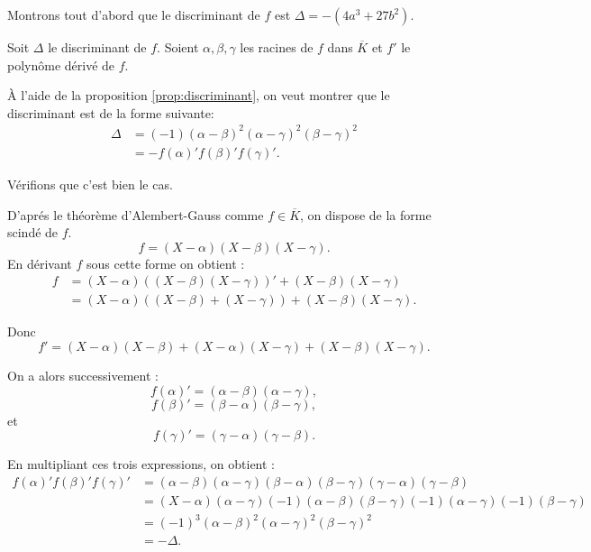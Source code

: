 \begin{demonstration}[Lemme]
    Montrons tout d'abord que le discriminant de $f$ est $\Delta= -(4a^3 + 27b^2)$.

    Soit $\Delta$ le discriminant de $f$. Soient $\alpha, \beta, \gamma $ les racines de $f$ dans $\overline{K}$ et $f'$ le polynôme dérivé de $f$.

    À l'aide de la proposition \ref{prop:discriminant}, on veut montrer que le discriminant est de la forme
    suivante: 
    \begin{align*}
        \Delta &= (-1) ( \alpha - \beta )^2 ( \alpha - \gamma )^2 ( \beta - \gamma )^2 \\
          &= - f(\alpha)'f(\beta )'f(\gamma)'
    .\end{align*}

    Vérifions que c'est bien le cas.

    D'aprés le théorème d'Alembert-Gauss comme $f \in \overline{K}$, on dispose de la
    forme scindé de $f$.
    \[
        f = \left( X - \alpha \right) \left( X - \beta \right) \left( X - \gamma \right) 
    .\] 
    En dérivant $f$ sous cette forme on obtient :
    \begin{align*}
        f &= ( X - \alpha ) \left( ( X - \beta ) ( X - \gamma ) \right)'  + ( X - \beta ) ( X - \gamma )\\
          &= ( X - \alpha ) \left( ( X - \beta ) + ( X - \gamma ) \right) + ( X - \beta ) ( X - \gamma ) 
    .\end{align*}

    Donc  
\[
f' = ( X - \alpha ) ( X - \beta ) + ( X - \alpha ) ( X - \gamma ) + ( X - \beta ) ( X - \gamma )
.\] 

On a alors successivement : 
\[
    f(\alpha)' = ( \alpha - \beta) ( \alpha - \gamma )
,\] 
\[
f(\beta )' = ( \beta - \alpha) ( \beta - \gamma)
,\] 
et
\[
f(\gamma)' = ( \gamma - \alpha) ( \gamma - \beta)
.\] 

En multipliant ces trois expressions, on obtient :
\begin{align*}
    f(\alpha)' f(\beta )' f(\gamma)' &= ( \alpha - \beta ) ( \alpha - \gamma ) ( \beta - \alpha ) ( \beta - \gamma) ( \gamma - \alpha ) ( \gamma - \beta ) \\
&= \left( X - \alpha \right) \left( \alpha - \gamma \right) \left( -1 \right) \left( \alpha - \beta  \right) \left( \beta - \gamma \right) \left( -1 \right) \left( \alpha - \gamma \right) \left( -1 \right) \left( \beta - \gamma \right) \\
&= \left( -1 \right) ^3 \left( \alpha - \beta  \right) ^2 \left( \alpha - \gamma  \right) ^2 \left( \beta - \gamma \right) ^2\\
 &= - \Delta
.\end{align*}


\end{demonstration}
